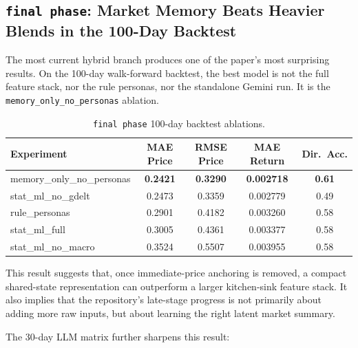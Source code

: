 \documentclass[11pt,a4paper]{article}
\begin{document}
\subsection{\texttt{final phase}: Market Memory Beats Heavier Blends in the 100-Day Backtest}

The most current hybrid branch produces one of the paper's most surprising results. On the 100-day walk-forward backtest, the best model is not the full feature stack, nor the rule personas, nor the standalone Gemini run. It is the \texttt{memory\_only\_no\_personas} ablation.

\begin{table}[t]
\centering
\small
\caption{\texttt{final phase} 100-day backtest ablations.}
\label{tab:finalphase_100}
\begin{tabular}{lcccc}
\toprule
\textbf{Experiment} & \textbf{MAE Price} & \textbf{RMSE Price} & \textbf{MAE Return} & \textbf{Dir.\ Acc.} \\
\midrule
memory\_only\_no\_personas & \textbf{0.2421} & \textbf{0.3290} & \textbf{0.002718} & \textbf{0.61} \\
stat\_ml\_no\_gdelt & 0.2473 & 0.3359 & 0.002779 & 0.49 \\
rule\_personas & 0.2901 & 0.4182 & 0.003260 & 0.58 \\
stat\_ml\_full & 0.3005 & 0.4361 & 0.003377 & 0.58 \\
stat\_ml\_no\_macro & 0.3524 & 0.5507 & 0.003955 & 0.58 \\
\bottomrule
\end{tabular}
\end{table}

This result suggests that, once immediate-price anchoring is removed, a compact shared-state representation can outperform a larger kitchen-sink feature stack. It also implies that the repository's late-stage progress is not primarily about adding more raw inputs, but about learning the right latent market summary.

The 30-day LLM matrix further sharpens this result:
\end{document}
